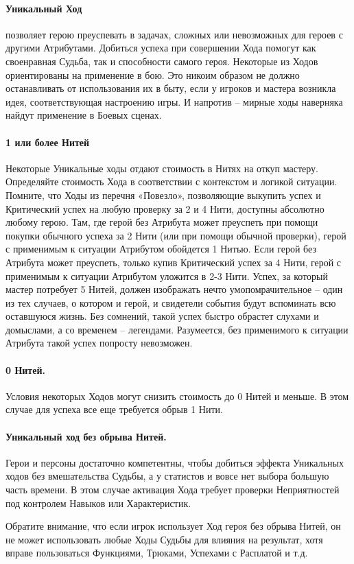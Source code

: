 \paragraph{Уникальный Ход} позволяет герою преуспевать в задачах, сложных или невозможных для героев с другими Атрибутами. Добиться успеха при совершении Хода помогут как своенравная Судьба, так и способности самого героя. 
\newline Некоторые из Ходов ориентированы на применение в бою. Это никоим образом не должно останавливать от использования их в быту, если у игроков и мастера возникла идея, соответствующая настроению игры. И напротив – мирные ходы наверняка найдут применение в Боевых сценах.
\paragraph{1 или более Нитей} Некоторые Уникальные ходы отдают стоимость в Нитях на откуп мастеру. Определяйте стоимость Хода в соответствии с контекстом и логикой ситуации. Помните, что Ходы из перечня «Повезло», позволяющие выкупить успех и Критический успех на любую проверку за 2 и 4 Нити, доступны абсолютно любому герою. Там, где герой без Атрибута может преуспеть при помощи покупки обычного успеха за 2 Нити (или при помощи обычной проверки), герой с применимым к ситуации Атрибутом обойдется 1 Нитью. Если герой без Атрибута может преуспеть, только купив Критический успех за 4 Нити, герой с применимым к ситуации Атрибутом уложится в 2-3 Нити. Успех, за который мастер потребует 5 Нитей, должен изображать нечто умопомрачительное – один из тех случаев, о котором и герой, и свидетели события будут вспоминать всю оставшуюся жизнь. Без сомнений, такой успех быстро обрастет слухами и домыслами, а со временем – легендами. Разумеется, без применимого к ситуации Атрибута такой успех попросту невозможен.
\paragraph{0 Нитей.} Условия некоторых Ходов могут снизить стоимость до 0 Нитей и меньше. В этом случае для успеха все еще требуется обрыв 1 Нити.
\paragraph{Уникальный ход без обрыва Нитей.} Герои и персоны достаточно компетентны, чтобы добиться эффекта Уникальных ходов без вмешательства Судьбы, а у статистов и вовсе нет выбора большую часть времени. В этом случае активация Хода требует проверки Неприятностей под контролем Навыков или Характеристик. 
\begin{tcolorbox}
    Обратите внимание, что если игрок использует Ход героя без обрыва Нитей, он не может использовать любые Ходы Судьбы для влияния на результат, хотя вправе пользоваться Функциями, Трюками, Успехами с Расплатой и т.д.
\end{tcolorbox}
